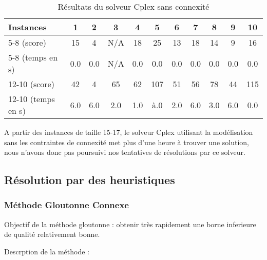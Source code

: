 \documentclass[a4paper,11pt]{article}
\begin{document}
\begin{table}[h!]
\begin{center}
\begin{tabular}{|l|c|c|c|c|c|c|c|c|c|c|}
\hline
Instances & 1 & 2 & 3 & 4 & 5 & 6 & 7 & 8 & 9 & 10  \\
\hline
5-8 (score)  & 15 & 4 & N/A & 18 & 25 & 13 & 18 & 14 & 9 & 16 \\
\hline
5-8 (temps en s)  & 0.0 & 0.0 & N/A & 0.0 & 0.0 & 0.0 & 0.0 & 0.0 & 0.0 & 0.0 \\
\hline
12-10 (score)       & 42  & 4   & 65  & 62  & 107 & 51  & 56  & 78  & 44  & 115\\
\hline
12-10 (temps en s)  & 6.0 & 6.0 & 2.0 & 1.0 & à.0 & 2.0 & 6.0 & 3.0 & 6.0 & 0.0 \\
\hline
\end{tabular}
\end{center}
\caption{Résultats du solveur Cplex sans connexité}
\end{table}

A partir des instances de taille 15-17, le solveur Cplex utilisant la modélisation sans les contraintes de connexité met plus d'une heure à trouver une solution, nous n'avons donc pas poursuivi nos tentatives de résolutions par ce solveur.

\subsection{Résolution par des heuristiques}

\subsubsection{Méthode Gloutonne Connexe}

Objectif de la méthode gloutonne : obtenir très rapidement une borne inferieure de qualité relativement bonne.

Descrption de la méthode : 
\end{document}
